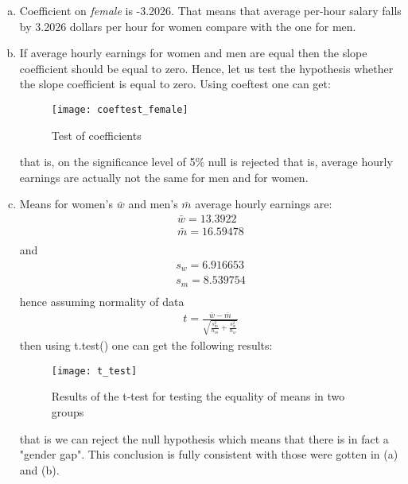 \documentclass[a4paper]{article}
\begin{document}
\begin{enumerate}[a.]
	\item Coefficient on \textit{female} is -3.2026. That means that average per-hour salary falls by 3.2026 dollars per hour for women compare with the one for men.
	\item If average hourly earnings for women and men are equal then the slope coefficient should be equal to zero. Hence, let us test the hypothesis whether the slope coefficient is equal to zero. Using coeftest one can get:
	
	
	\begin{figure}[H]
		\centering
		\texttt{[image: coeftest\_female]}
		\caption{Test of coefficients}
	\end{figure}

	that is, on the significance level of 5\% null is rejected that is, average hourly earnings are actually not the same for men and for women.
	\item Means for women's $\bar{w}$ and men's $\bar{m}$ average hourly earnings are:
	\begin{align*}
	\bar{w} = 13.3922\\
	\bar{m} = 16.59478\\
	\end{align*}
	and
	\begin{align*}
	s_w = 6.916653\\
	s_m = 8.539754\\
	\end{align*}
	hence assuming normality of data
	\begin{align*}
	t = \frac{\bar{w} - \bar{m}}{\sqrt{\frac{s_m^2}{n_m} + \frac{s_w^2}{n_w}}}
	\end{align*}
	then using t.test() one can get the following results:
		\begin{figure}[H]
		\centering
		\texttt{[image: t\_test]}
		\caption{Results of the t-test for testing the equality of means in two groups}
	\end{figure}
that is we can reject the null hypothesis which means that there is in fact a "gender gap". This conclusion is fully consistent with those were gotten in (a) and (b).
\end{enumerate}
\end{document}

